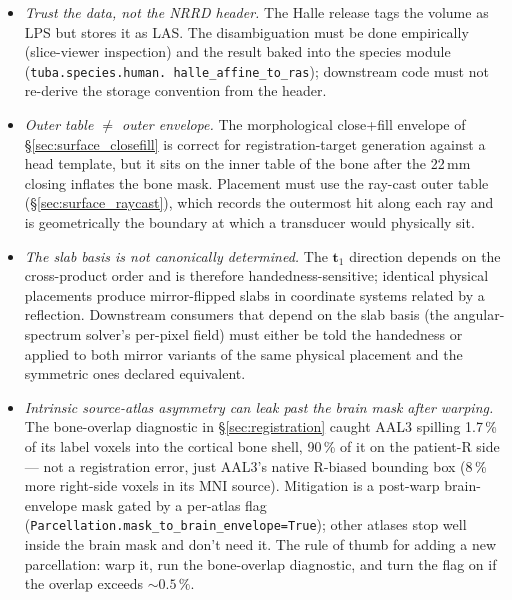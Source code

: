\documentclass{compactarticle}
\begin{document}
\begin{itemize}
\item {\em Trust the data, not the NRRD header.} The Halle release tags
  the volume as LPS but stores it as LAS. The disambiguation must be
  done empirically (slice-viewer inspection) and the result baked into
  the species module (\texttt{tuba.species.human.\allowbreak
  halle\_affine\_to\_ras}); downstream code must not re-derive the
  storage convention from the header.
\item {\em Outer table $\neq$ outer envelope.} The morphological
  close+fill envelope of \S\ref{sec:surface_closefill} is correct for
  registration-target generation against a head template, but it sits
  on the inner table of the bone after the 22\,mm closing inflates
  the bone mask. Placement must use the ray-cast outer table
  (\S\ref{sec:surface_raycast}), which records the outermost hit
  along each ray and is geometrically the boundary at which a
  transducer would physically sit.
\item {\em The slab basis is not canonically determined.} The
  $\mathbf{t}_1$ direction depends on the cross-product order and is
  therefore handedness-sensitive; identical physical placements
  produce mirror-flipped slabs in coordinate systems related by a
  reflection. Downstream consumers that depend on the slab basis (the
  angular-spectrum solver's per-pixel field) must either be told the
  handedness or applied to both mirror variants of the same physical
  placement and the symmetric ones declared equivalent.
\item {\em Intrinsic source-atlas asymmetry can leak past the brain
  mask after warping.} The bone-overlap diagnostic in
  \S\ref{sec:registration} caught AAL3 spilling 1.7\,\% of its label
  voxels into the cortical bone shell, 90\,\% of it on the patient-R
  side --- not a registration error, just AAL3's native R-biased
  bounding box (8\,\% more right-side voxels in its MNI source).
  Mitigation is a post-warp brain-envelope mask gated by a per-atlas
  flag (\texttt{Parcellation.mask\_to\_brain\_envelope=True}); other
  atlases stop well inside the brain mask and don't need it. The
  rule of thumb for adding a new parcellation: warp it, run the
  bone-overlap diagnostic, and turn the flag on if the overlap
  exceeds $\sim 0.5\,\%$.
\end{itemize}
\end{document}
